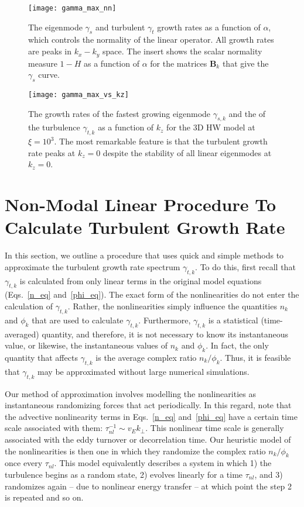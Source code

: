 \documentclass[twocolumn,showkeys,superscriptaddress]{revtex4}
\begin{document}
\begin{figure}
\centerline{\texttt{[image: gamma\_max\_nn]}}
\caption{The eigenmode $\gamma_{s}$ and turbulent $\gamma_{t}$ growth rates as a function of $\alpha$, which controls the normality of the linear operator. All growth rates are peaks in $k_x-k_y$ space.
The insert shows the scalar normality measure $1-H$ as a function of $\alpha$ for the matrices $\mathbf{B}_k$ that give the $\gamma_{s}$ curve.}
\label{gamma_max_vs_alpha}
\end{figure}

\begin{figure}
\centerline{\texttt{[image: gamma\_max\_vs\_kz]}}
\caption{The growth rates of the fastest growing eigenmode $\gamma_{s,k}$ and the of the turbulence $\gamma_{t,k}$ as a function of $k_z$ for the 3D HW model at $\xi = 10^3$. The most remarkable feature is
that the turbulent growth rate peaks at $k_z=0$ despite the stability of all linear eigenmodes at $k_z=0$.}
\label{gamma_max_vs_kz}
\end{figure}

\section{Non-Modal Linear Procedure To Calculate Turbulent Growth Rate}
\label{sec_nm_procedure}

In this section, we outline a procedure that uses quick and simple methods to approximate the turbulent growth rate spectrum $\gamma_{t,k}$. To do this, first recall that $\gamma_{t,k}$ is calculated
from only linear terms in the original model equations (Eqs.~\ref{n_eq} and~\ref{phi_eq}). The exact form of the nonlinearities do not enter the calculation of $\gamma_{t,k}$. Rather, the nonlinearities
simply influence the quantities $n_k$ and $\phi_k$ that are used to calculate $\gamma_{t,k}$. Furthermore, $\gamma_{t,k}$ is a statistical (time-averaged) quantity, and therefore, it is not
necessary to know its instantaneous value, or likewise, the instantaneous values of $n_k$ and $\phi_k$. In fact, the only quantity that affects $\gamma_{t,k}$ is the average complex ratio $n_k/\phi_k$.
Thus, it is feasible that $\gamma_{t,k}$ may be approximated without large numerical simulations.

Our method of approximation involves modelling the nonlinearities as instantaneous randomizing forces that act periodically.
In this regard, note that the advective nonlinearity terms in Eqs.~\ref{n_eq} and~\ref{phi_eq} have a certain time scale associated with them: $\tau_{nl}^{-1} \sim v_E k_\perp$.
This nonlinear time scale is generally associated with the eddy turnover or decorrelation time. Our heuristic model of the nonlinearities is then one
in which they randomize the complex ratio $n_k/\phi_k$ once every $\tau_{nl}$.
This model equivalently describes a system in which 1) the turbulence begins as a random state, 
2) evolves linearly for a time $\tau_{nl}$, and 3) randomizes again -- due to nonlinear energy transfer -- at which point the step 2 is repeated and so on.
\end{document}
